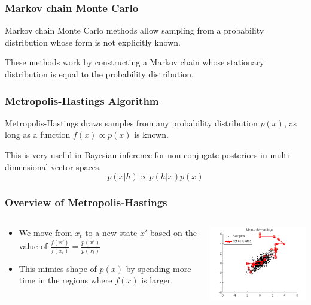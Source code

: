 \begin{frame}
  \frametitle{Markov chain Monte Carlo}
  Markov chain Monte Carlo methods allow sampling from a
  probability distribution whose form is not explicitly known.
  \vspace{3em}

  These methods work by constructing a Markov chain whose stationary
  distribution is equal to the probability distribution.
\end{frame}

\begin{frame}
  \frametitle{Metropolis-Hastings Algorithm}
  \begin{center}
    Metropolis-Hastings draws samples from any probability distribution $p(x)$, as long as a
    function $f(x) \propto p(x)$ is known.
    \vspace{3em}

    This is very useful in Bayesian inference for non-conjugate posteriors
    in multi-dimensional vector spaces.
    \[p(x|h) \propto p(h|x) p(x)\]
  \end{center}
\end{frame}

\begin{frame}
  \frametitle{Overview of Metropolis-Hastings}
  \begin{columns}
    \begin{column}{0.4\textwidth}
      \begin{itemize}
      \item We move from $x_t$ to a new state $x'$ based on the value of
        $\frac{f(x')}{f(x_t)} = \frac{p(x')}{p(x_t)}$
      \item This mimics shape of $p(x)$ by spending more time in the regions where $f(x)$ is larger.
      \end{itemize}
    \end{column}
    \begin{column}{0.6\textwidth}
      \includegraphics[width=3in]{img/metropolis-hastings}
    \end{column}
  \end{columns}
\end{frame}

